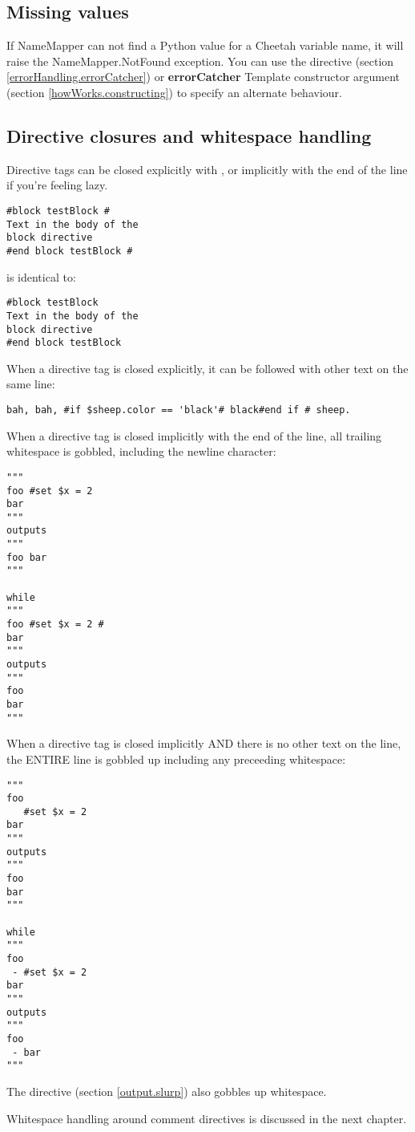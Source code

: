 \subsection{Missing values}
\label{language.namemapper.missing}

If NameMapper can not find a Python value for a Cheetah variable name, it will
raise the NameMapper.NotFound exception.  You can use the 
directive (section \ref{errorHandling.errorCatcher}) or {\bf errorCatcher}
Template constructor argument (section \ref{howWorks.constructing}) to specify
an alternate behaviour.


\subsection{Directive closures and whitespace handling}
\label{language.directives.closures}
Directive tags can be closed explicitly with \code{\#}, or implicitly with the
end of the line if you're feeling lazy.

\begin{verbatim}
#block testBlock #
Text in the body of the
block directive
#end block testBlock #
\end{verbatim}
is identical to:
\begin{verbatim}
#block testBlock
Text in the body of the
block directive
#end block testBlock
\end{verbatim}

When a directive tag is closed explicitly, it can be followed with other text on
the same line:

\begin{verbatim}
bah, bah, #if $sheep.color == 'black'# black#end if # sheep.
\end{verbatim}

When a directive tag is closed implicitly with the end of the line, all trailing
whitespace is gobbled, including the newline character:
\begin{verbatim}
"""
foo #set $x = 2 
bar
"""
outputs 
"""
foo bar
"""

while 
"""
foo #set $x = 2 #
bar
"""
outputs 
"""
foo 
bar
"""
\end{verbatim}

When a directive tag is closed implicitly AND there is no other text on the
line, the ENTIRE line is gobbled up including any preceeding whitespace:
\begin{verbatim}
"""
foo 
   #set $x = 2 
bar
"""
outputs 
"""
foo
bar
"""

while 
"""
foo 
 - #set $x = 2
bar
"""
outputs 
"""
foo 
 - bar
"""
\end{verbatim}

The  directive (section \ref{output.slurp}) also gobbles up
whitespace.

Whitespace handling around comment directives is discussed in the next
chapter.




